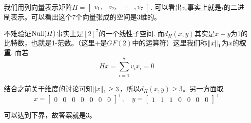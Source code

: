 我们用列向量表示矩阵$H = \begin{bmatrix}
    v_1, & v_2, & \cdots & ,v_7
\end{bmatrix}$. 可以看出$v_i$事实上就是$i$的二进制表示。可以看出这个7个向量张成的空间是3维的。

不难验证$\operatorname*{Null}(H)$事实上是$[2]^7$的一个线性子空间. 而$d_H(x, y)$其实是$x + y$为1的比特数，也就是1-范数。（这里$+$是$GF(2)$中的运算符）这里我们称$\left\lVert x\right\rVert_1$为$x$的\textbf{权重}. 而若
\[
Hx = \sum_{i=1}^7 v_i x_i = 0
\]

结合之前关于维度的讨论可知$\left\lVert x\right\rVert_1 \ge 3$，所以$d_H(x,y) \ge 3$。另一方面取
\[
x = \begin{bmatrix}
    0 & 0 & 0 & 0 & 0 & 0 & 0
\end{bmatrix}^\top, \quad 
y = \begin{bmatrix}
    1 & 1 & 1 & 0 & 0 & 0 & 0
\end{bmatrix}^\top
\]

可以达到下界，故答案就是$3$。

